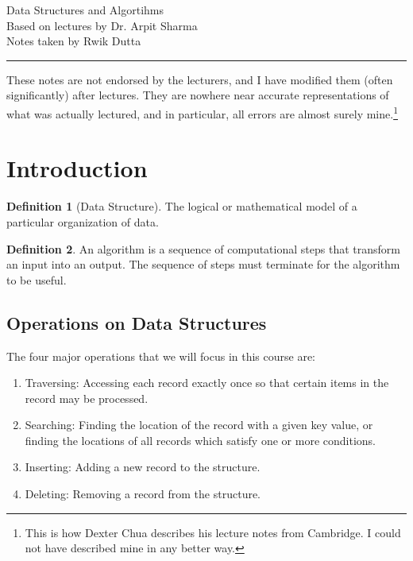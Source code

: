 \documentclass[10pt, a4paper]{extarticle}
\theoremstyle{definition}
\newtheorem{defn}{Definition}
\begin{document}
	\begin{center}
		\fontsize{25}{60}\selectfont Data Structures and Algortihms \\
		\large Based on lectures by Dr. Arpit Sharma\\
		Notes taken by Rwik Dutta
	\end{center}
	\hrule
	\begin{center}
		These notes are not endorsed by the lecturers, and I have modified them (often
significantly) after lectures. They are nowhere near accurate representations of what
was actually lectured, and in particular, all errors are almost surely mine.\footnote[1]{This is how Dexter Chua describes his lecture notes from Cambridge. I could not have described mine in any better way.}
	\end{center}
	\tableofcontents
	
	\newpage
	\section{Introduction}
	\begin{defn}[Data Structure]
		 The logical or mathematical model of a particular organization of data.
	\end{defn}
	\begin{defn}
		An algorithm is a sequence of computational steps that transform an input into an output. The sequence of steps must terminate for the algorithm to be useful.
	\end{defn}
	\subsection{Operations on Data Structures}
	The four major operations that we will focus in this course are:
	\begin{enumerate}
		\item Traversing: Accessing each record exactly once so that certain items in the record may be processed.
		\item Searching: Finding the location of the record with a given key value, or finding the locations of all records which satisfy one or more conditions.
		\item Inserting: Adding a new record to the structure.
		\item Deleting: Removing a record from the structure.
\end{enumerate}
\end{document}
